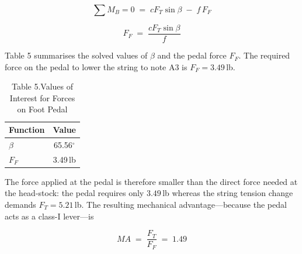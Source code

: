 \documentclass[12pt]{article}
\theoremstyle{definition} %
\theoremstyle{plain} %
\begin{document}
\begin{equation}
  \sum M_B = 0
  \;=\;
  cF_T\sin\beta \;-\; f\,F_F
  \tag{28}
\end{equation}

\begin{equation}
  F_F
  \;=\;
  \frac{cF_T\sin\beta}{f}
  \tag{29}
\end{equation}

Table 5 summarises the solved values of $\beta$ and the pedal force $F_F$.
The required force on the pedal to lower the string to note A3 is
$F_F = 3.49$\,lb.

\begin{table}[ht]
\centering
\caption*{Table 5.\;Values of Interest for Forces on Foot Pedal}
\begin{tabular}{|l|c|}
\hline
\textbf{Function} & \textbf{Value} \\ \hline
$\beta$ & 65.56$^\circ$ \\ \hline
$F_F$   & 3.49\,lb \\ \hline
\end{tabular}
\end{table}

The force applied at the pedal is therefore smaller than the direct force
needed at the head-stock: the pedal requires only $3.49$\,lb whereas the
string tension change demands $F_T = 5.21$\,lb.  
The resulting mechanical advantage—because the pedal acts as a class-I
lever—is

\begin{equation}
  MA \;=\; \frac{F_T}{F_F} \;=\; 1.49
  \tag{30}
\end{equation}
\end{document}
